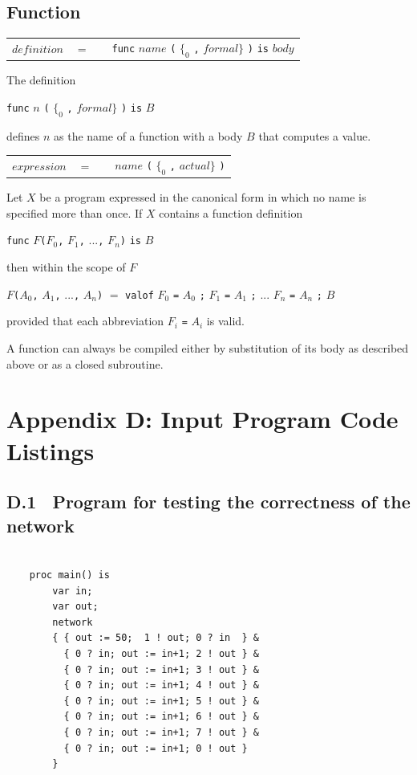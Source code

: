 \documentclass[a4paper, 12pt]{article}
\begin{document}
\subsection*{Function}

\begin{tabular}{llll}
$definition$    & $=$ && \verb|func| $name$ \verb|(| $\{_0$ \verb:,: $formal \}$ \verb|)| \verb|is| $body$\\
\end{tabular}   

The definition 

\verb|func| $n$ \verb|(| $\{_0$ \verb:,: $formal \}$ \verb|)| \verb|is| $B$

defines $n$ as the name of a function with a body $B$ that computes a value.

\begin{tabular}{llll}
$expression$    & $=$ &&$name$ \verb|(| $\{_0$ \verb:,: $actual \}$ \verb|)| 
\end{tabular}   

Let $X$ be a program expressed in the canonical form in which no name is specified more than once. If $X$
contains a function definition 

\verb|func| $F$\verb|(|$F_0$\verb|,| $F_1$\verb|,| ...\verb|,| $F_n$\verb|)| \verb|is| $B$

then within the scope of $F$

$F$\verb|(|$A_0$\verb|,| $A_1$\verb|,| ...\verb|,| $A_n$\verb|)| $=$ \verb|valof| $F_0$ \verb|=| $A_0$ \verb|;| $F_1$ \verb|=| $A_1$ \verb|;| ... $F_n$ \verb|=| $A_n$ \verb|;| $B$

provided that each abbreviation $F_i$ \verb|=| $A_i$ is valid. 

A function can always be compiled either by substitution of its body as described above or as a closed
subroutine.

\newpage
\section*{Appendix D: Input Program Code Listings}

\subsection*{D.1 \ Program for testing the correctness of the network}

\begin{lstlisting}

    proc main() is
        var in;
        var out;
        network 
        { { out := 50;  1 ! out; 0 ? in  } &
          { 0 ? in; out := in+1; 2 ! out } &
          { 0 ? in; out := in+1; 3 ! out } &
          { 0 ? in; out := in+1; 4 ! out } &
          { 0 ? in; out := in+1; 5 ! out } &
          { 0 ? in; out := in+1; 6 ! out } &
          { 0 ? in; out := in+1; 7 ! out } &
          { 0 ? in; out := in+1; 0 ! out } 
        }

\end{lstlisting}
\end{document}
